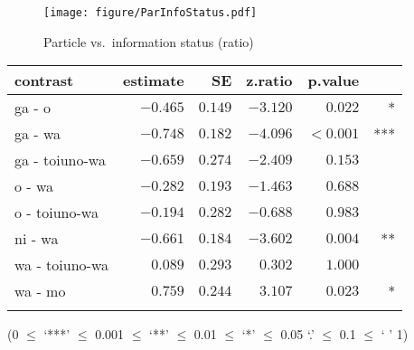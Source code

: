 \begin{figure}

  \texttt{[image: figure/ParInfoStatus.pdf]}
  \caption{Particle vs.\ information status (ratio)}
  \label{ParInfoStatusCTF}

\end{figure}

\begin{table}

 \label{Par:InfoStatusPar:LSMEANST}
 \begin{tabularx}{\textwidth}{Xrrrrr}
 \lsptoprule
 contrast      &    estimate &        SE & z.ratio & p.value & \\
 \midrule
  ga - o         & $-0.465$ & $0.149$ & $-3.120$ &  $0.022$ & * \\
  ga - wa        & $-0.748$ & $0.182$ & $-4.096$ & $<0.001$ & *** \\
  ga - toiuno-wa & $-0.659$ & $0.274$ & $-2.409$ &  $0.153$ &  \\
  o - wa         & $-0.282$ & $0.193$ & $-1.463$ &  $0.688$ &  \\
  o - toiuno-wa  & $-0.194$ & $0.282$ & $-0.688$ &  $0.983$ &  \\
  ni - wa        & $-0.661$ & $0.184$ & $-3.602$ &  $0.004$ & ** \\
  wa - toiuno-wa & $ 0.089$ & $0.293$ & $ 0.302$ &  $1.000$ &  \\
  wa - mo        & $ 0.759$ & $0.244$ & $ 3.107$ &  $0.023$ & * \\
 \lspbottomrule
 \end{tabularx}

\hfill{(0 $\le$ `***' $\le$ 0.001 $\le$ `**' $\le$ 0.01 $\le$ `*' $\le$ 0.05 `.' $\le$ 0.1 $\le$ ` ' 1)}
\end{table}

